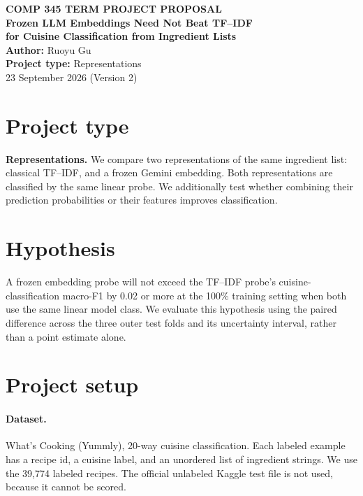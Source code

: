 ﻿\documentclass[11pt,letterpaper]{article}
\begin{document}
\begin{center}
{\small\bfseries\color{navy} COMP 345 TERM PROJECT PROPOSAL}\\[0.3em]
{\LARGE\bfseries\color{navy} Frozen LLM Embeddings Need Not Beat TF--IDF}\\[0.12em]
{\large\bfseries\color{navy} for Cuisine Classification from Ingredient Lists}\\[0.55em]
{\normalsize \textbf{Author:} Ruoyu Gu}\\[0.12em]
{\normalsize \textbf{Project type:} Representations}\\[0.1em]
{\normalsize 23 September 2026 (Version 2)}
\end{center}

\section{Project type}

\textbf{Representations.} We compare two representations of the same ingredient list: classical TF--IDF, and a frozen Gemini embedding. Both representations are classified by the same linear probe. We additionally test whether combining their prediction probabilities or their features improves classification.

\section{Hypothesis}

A frozen embedding probe will not exceed the TF--IDF probe's cuisine-classification macro-F1 by 0.02 or more at the 100\% training setting when both use the same linear model class. We evaluate this hypothesis using the paired difference across the three outer test folds and its uncertainty interval, rather than a point estimate alone.

\section{Project setup}

\paragraph{Dataset.}
What's Cooking (Yummly), 20-way cuisine classification. Each labeled example has a recipe id, a cuisine label, and an unordered list of ingredient strings. We use the 39{,}774 labeled recipes. The official unlabeled Kaggle test file is not used, because it cannot be scored.
\end{document}
